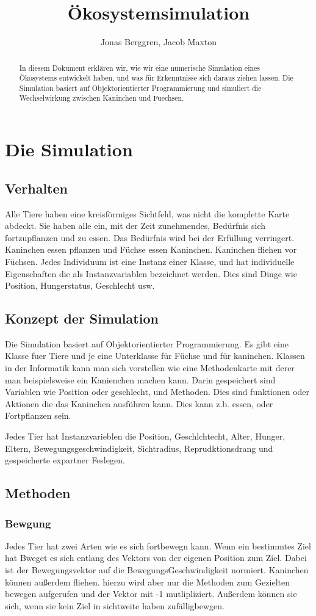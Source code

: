 \documentclass[12pt]{article}
\author{{\Large Jonas Berggren, Jacob Maxton}}
\title{{\myfont Ökosystemsimulation}}
\begin{document}
\maketitle
\begin{abstract}
In diesem Dokument erklären wir, wie wir eine numerische Simulation eines
	Ökosystems entwickelt haben, und was für Erkenntnisse sich daraus ziehen lassen.
Die Simulation basiert auf Objektorientierter Programmierung und simuliert die Wechselwirkung zwischen Kaninchen und Fuechsen.
\end{abstract}
\tableofcontents
\newpage
\section{Die Simulation}
\subsection{Verhalten}
Alle Tiere haben eine kreisförmiges Sichtfeld, was nicht die komplette Karte abdeckt.
Sie haben alle ein, mit der Zeit zunehmendes, Bedürfnis sich fortzupflanzen und zu essen.
Das Bedürfnis wird bei der Erfüllung verringert.
Kaninchen essen pflanzen und Füchse essen Kaninchen.
Kaninchen fliehen vor Füchsen.
Jedes Individuum ist eine Instanz einer Klasse, und hat individuelle
Eigenschaften die als Instanzvariablen bezeichnet werden.
Dies sind Dinge wie Position, Hungerstatus, Geschlecht usw.

\subsection{Konzept der Simulation}
Die Simulation basiert auf Objektorientierter Programmierung.
Es gibt eine Klasse fuer Tiere und je eine Unterklasse für Füchse und für kaninchen.
Klassen in der Informatik kann man sich vorstellen wie eine Methodenkarte mit derer man beispielsweise ein Kanienchen machen kann.
Darin gespeichert sind Variablen wie Position oder geschlecht, und Methoden.
Dies sind funktionen oder Aktionen die das Kaninchen ausführen kann.
Dies kann z.b. essen, oder Fortpflanzen sein.

Jedes Tier hat Instanzvarieblen die Position, Geschlchtecht, Alter, Hunger, Eltern, Bewegungsgeschwindigkeit, Sichtradius, Reprudktionsdrang und gespeicherte expartner Feslegen.
\subsection{Methoden}
\subsubsection{Bewgung}
Jedes Tier hat zwei Arten wie es sich fortbewegn kann.
Wenn ein bestimmtes Ziel hat Bweget es sich entlang des Vektors von der eigenen Position zum Ziel.
Dabei ist der Bewegungsvektor auf die BewegungsGeschwindigkeit normiert.
Kaninchen können außerdem fliehen.
hierzu wird aber nur die Methoden zum Gezielten bewegen aufgerufen und der Vektor mit -1 mutlipliziert.
Außerdem können sie sich, wenn sie kein Ziel in sichtweite haben zufälligbewgen.
\end{document}
